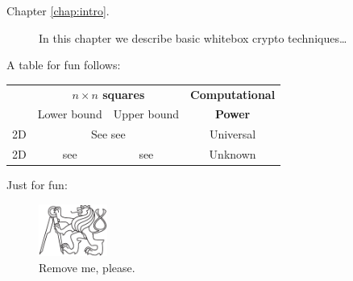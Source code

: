 	\begin{description}
		\item[Chapter \ref{chap:intro}.] In this chapter we describe basic whitebox crypto techniques\ldots
	\end{description}


A table for fun follows:
\begin{center}
\begin{tabular}{|| c || c | c | c ||}
	\hline\hline
	~ & \multicolumn{2}{c|}{\bf $n\times n$ squares} & {\bf Computational} \\
	~ & \multicolumn{1}{c}{Lower bound} & \multicolumn{1}{c|}{Upper bound} & {\bf Power}\\
	\hline
	2D & \multicolumn{2}{c|}{See see} & Universal \\
	\hline
	2D & see & see & Unknown \\
	\hline\hline
\end{tabular}
\end{center}

Just for fun:
\begin{figure}[H]
\begin{center}
	\includegraphics[width=0.2\textwidth]{./figures/fig.pdf} %
	\caption{Remove me, please.}
	\label{fig:3color}
\end{center}
\end{figure}

